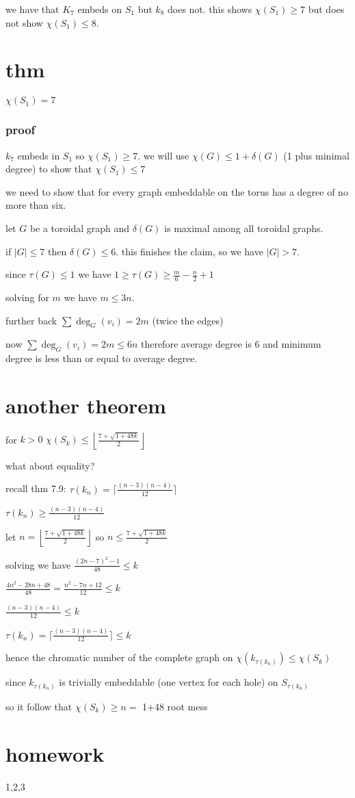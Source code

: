 \documentclass[letterpaper]{article}
\begin{document}
we have that $K_7$ embeds on $S_1$ but $k_8$ does not. this shows $\chi(S_1)\ge 7$ but does not show $\chi(S_1)\le 8$.

\section*{thm}
$\chi(S_1)=7$

\subsubsection*{proof}
$k_7$ embeds in $S_1$ so $\chi(S_1)\ge 7$. we will use $\chi(G)\le 1+\delta(G)$ (1 plus minimal degree) to show that $\chi(S_1)\le 7$

we need to show that for every graph embeddable on the torus has a degree of no more than six.

let $G$ be a toroidal graph and $\delta(G)$ is maximal among all toroidal graphs.

if $|G|\le 7$ then $\delta(G)\le 6$. this finishes the claim, so we have $|G|>7$.

since $\tau(G)\le 1$ we have $1\ge \tau(G)\ge \frac{m}{6}-\frac{n}{2}+1$

solving for $m$ we have $m\le 3n$. 

further back $\sum\limits{\deg_G(v_i)}=2m$ (twice the edges)

now $\sum\limits{\deg_G(v_i)}=2m\le 6n$ therefore average degree is 6 and minimum degree is less than or equal to average degree.

\section*{another theorem}
for $k>0$ $\chi(S_k)\le\left\lfloor\frac{7+\sqrt{1+48k}}{2}\right\rfloor$

what about equality?

recall thm 7.9: $\tau(k_n)=\lceil\frac{(n-3)(n-4)}{12}\rceil$

$\tau(k_n)\ge \frac{(n-3)(n-4)}{12}$

let $n=\left\lfloor\frac{7+\sqrt{1+48k}}{2}\right\rfloor$ so $n\le\frac{7+\sqrt{1+48k}}{2}$

solving we have $\frac{(2n-7)^2-1}{48}\le k$

$\frac{4n^2-28n+48}{48}=\frac{n^2-7n+12}{12}\le k$

$\frac{(n-3)(n-4)}{12}\le k$

$\tau(k_n)=\lceil\frac{(n-3)(n-4)}{12}\rceil\le k$

hence the chromatic number of the complete graph on $\chi(k_{\tau(k_n)})\le \chi(S_k)$

since $k_{\tau (k_n)}$ is trivially embeddable (one vertex for each hole) on $S_{\tau(k_n)}$

so it follow that $\chi(S_k)\ge n=$ 1+48 root mess

\section*{homework}
1,2,3
\end{document}
